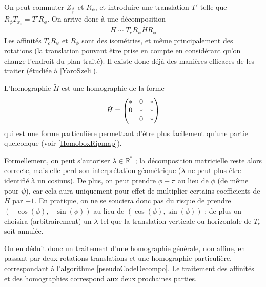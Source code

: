  On peut commuter $Z_{\frac{\delta}{\delta'}}$ et $R_{\psi}$, et introduire une translation $T'$ telle que $R_{\phi}  T_{x_{v}} = T' R_\phi$. On arrive donc à une décomposition
   \begin{equation*}
H \sim T_{c} R_{\psi}  \tilde H R_{\phi}
  \end{equation*}
  Les affinités $T_{c} R_{\psi}$ et $R_{\phi}$ sont des isométries, et même principalement des rotations (la translation pouvant être prise en compte en considérant qu'on change l'endroit du plan traité). Il existe donc déjà des manières efficaces de les traiter (étudiée à \ref{YaroSzeli}).
  
  L'homographie $\tilde H$ est une homographie de la forme
  \[\tilde H = \begin{pmatrix} *&0&*\\0&*&*\\*&0&* \end{pmatrix}\]
  qui est une forme particulière permettant d'être plus facilement qu'une partie quelconque (voir \ref{HomoboxRipmap}).
  
 Formellement, on peut s'autoriser $\lambda \in \mathbb R^*$ ; la décomposition matricielle reste alors correcte, mais elle perd son interprétation géométrique ($\lambda$ ne peut plus être identifié à un cosinus). De plus, on peut prendre $\phi + \pi$ au lieu de $\phi$ (de même pour $\psi$), car cela aura uniquement pour effet de multiplier certains coefficients de $\tilde H$ par $-1$. En pratique, on ne se souciera donc pas du risque de prendre $(-\cos(\phi),-\sin(\phi))$ au lieu de $(\cos(\phi),\sin(\phi))$ ; de plus on choisira (arbitrairement) un $\lambda$ tel que la translation verticale ou horizontale de $T_c$ soit annulée.
 
 On en déduit donc un traitement d'une homographie générale, non affine, en passant par deux rotations-translations et une homographie particulière, correspondant à l'algorithme \ref{pseudoCodeDecompo}. Le traitement des affinités et des homographies correspond aux deux prochaines parties.
		

